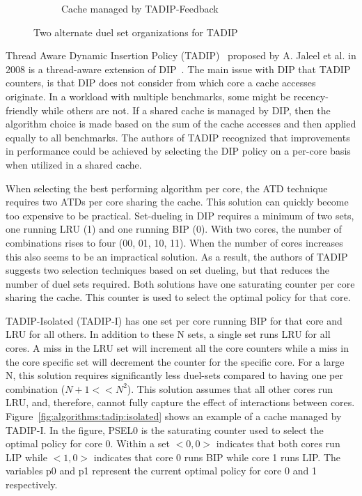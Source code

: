 \begin{figure}[H]
\begin{subfigure}[b]{0.5\textwidth}
        \caption{Cache managed by TADIP-Feedback}
        \label{fig:algorithms:tadip:feedback}
    \end{subfigure}    
    \caption{Two alternate duel set organizations for TADIP}
    \label{fig:algorithms:tadip}
\end{figure}

Thread Aware Dynamic Insertion Policy (TADIP)~\cite{Jaleel2008} proposed by A. Jaleel et al. in 2008 is a thread-aware extension of DIP~\cite{Qureshi2007}.
The main issue with DIP that TADIP counters, is that DIP does not consider from which core a cache accesses originate.
In a workload with multiple benchmarks, some might be recency-friendly while others are not. 
If a shared cache is managed by DIP, then the algorithm choice is made based on the sum of the cache accesses and then applied equally to all benchmarks.
The authors of TADIP recognized that improvements in performance could be achieved by selecting the DIP policy on a per-core basis when utilized in a shared cache.

When selecting the best performing algorithm per core, the ATD technique requires two ATDs per core sharing the cache. 
This solution can quickly become too expensive to be practical.
Set-dueling in DIP requires a minimum of two sets, one running LRU (1) and one running BIP (0). 
With two cores, the number of combinations rises to four (00, 01, 10, 11).
When the number of cores increases this also seems to be an impractical solution.
As a result, the authors of TADIP suggests two selection techniques based on set dueling, but that reduces the number of duel sets required.
Both solutions have one saturating counter per core sharing the cache.
This counter is used to select the optimal policy for that core.

TADIP-Isolated (TADIP-I) has one set per core running BIP for that core and LRU for all others.
In addition to these N sets, a single set runs LRU for all cores. 
A miss in the LRU set will increment all the core counters while a miss in the core specific set will decrement the counter for the specific core.
For a large N, this solution requires significantly less duel-sets compared to having one per combination ($N+1 << N^2$). 
This solution assumes that all other cores run LRU, and, therefore, cannot fully capture the effect of interactions between cores.
Figure~\ref{fig:algorithms:tadip:isolated} shows an example of a cache managed by TADIP-I. 
In the figure, PSEL0 is the saturating counter used to select the optimal policy for core 0.
Within a set $<0, 0>$ indicates that both cores run LIP while $<1, 0>$ indicates that core 0 runs BIP while core 1 runs LIP.
The variables p0 and p1 represent the current optimal policy for core 0 and 1 respectively.

